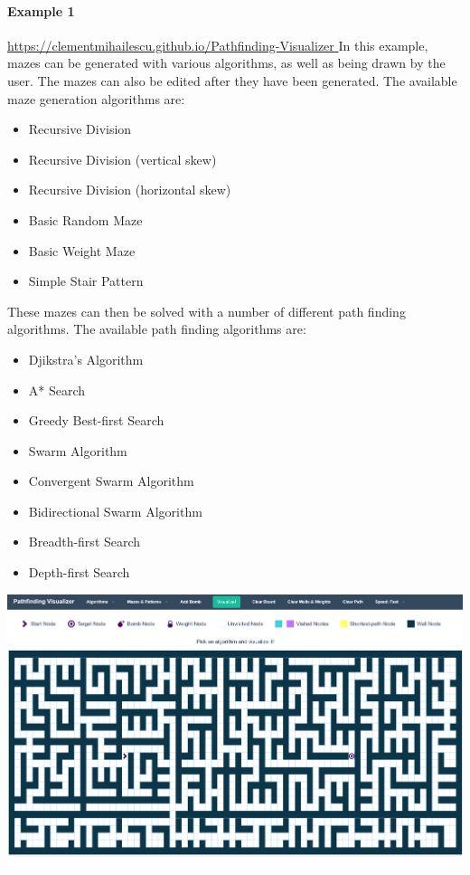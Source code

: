 \documentclass{article}
\begin{document}
\paragraph{Example 1}
\href{https://clementmihailescu.github.io/Pathfinding-Visualizer/
}{https://clementmihailescu.github.io/Pathfinding-Visualizer
}
\newline
In this example, mazes can be generated with various algorithms, as well as being drawn by the user. The mazes can also be edited after they have been generated. The available maze generation algorithms are:
\begin{itemize}
    \item Recursive Division
    \item Recursive Division (vertical skew)
    \item Recursive Division (horizontal skew)
    \item Basic Random Maze
    \item Basic Weight Maze
    \item Simple Stair Pattern
\end{itemize}
These mazes can then be solved with a number of different path finding algorithms. The available path finding algorithms are:
\begin{itemize}
    \item Djikstra's Algorithm
    \item A* Search
    \item Greedy Best-first Search
    \item Swarm Algorithm
    \item Convergent Swarm Algorithm
    \item Bidirectional Swarm Algorithm
    \item Breadth-first Search
    \item Depth-first Search
\end{itemize}
\includegraphics[width=\linewidth]{assets/Existing Solutions/example 1.PNG}
\end{document}
